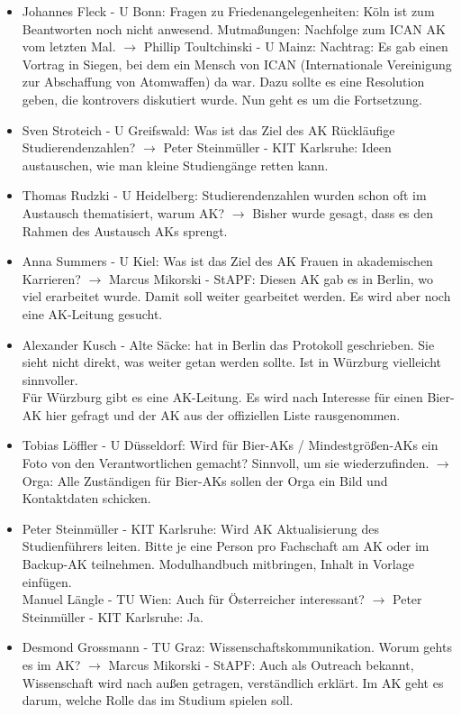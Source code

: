     \begin{itemize}
      \item Johannes Fleck - U Bonn:  Fragen zu Friedenangelegenheiten: Köln ist zum Beantworten noch nicht anwesend. Mutmaßungen: Nachfolge zum ICAN AK vom letzten Mal.
        $\rightarrow$ Phillip Toultchinski - U Mainz:  Nachtrag: Es gab einen Vortrag in Siegen, bei dem ein Mensch von ICAN (Internationale Vereinigung zur Abschaffung von Atomwaffen) da war. Dazu sollte es eine Resolution geben, die kontrovers diskutiert wurde. Nun geht es um die Fortsetzung.
      \item Sven Stroteich - U Greifswald:  Was ist das Ziel des AK Rückläufige Studierendenzahlen? $\rightarrow$ Peter Steinmüller - KIT Karlsruhe:  Ideen austauschen, wie man kleine Studiengänge retten kann.
      \item Thomas Rudzki - U Heidelberg:  Studierendenzahlen wurden schon oft im Austausch thematisiert, warum AK? $\rightarrow$ Bisher wurde gesagt, dass es den Rahmen des Austausch AKs sprengt.
      \item Anna Summers - U Kiel:  Was ist das Ziel des AK Frauen in akademischen Karrieren? $\rightarrow$ Marcus Mikorski - StAPF:  Diesen AK gab es in Berlin, wo viel erarbeitet wurde. Damit soll weiter gearbeitet werden. Es wird aber noch eine AK-Leitung gesucht.
      \item Alexander Kusch - Alte Säcke:  hat in Berlin das Protokoll geschrieben. Sie sieht nicht direkt, was weiter getan werden sollte. Ist in Würzburg vielleicht sinnvoller. \\
        Für Würzburg gibt es eine AK-Leitung. Es wird nach Interesse für einen Bier-AK hier gefragt und der AK aus der offiziellen Liste rausgenommen.
      \item Tobias Löffler - U Düsseldorf:  Wird für Bier-AKs / Mindestgrößen-AKs ein Foto von den Verantwortlichen gemacht? Sinnvoll, um sie wiederzufinden. $\rightarrow$ Orga: Alle Zuständigen für Bier-AKs sollen der Orga ein Bild und Kontaktdaten schicken.
      \item Peter Steinmüller - KIT Karlsruhe:  Wird AK Aktualisierung des Studienführers leiten. Bitte je eine Person pro Fachschaft am AK oder im Backup-AK teilnehmen. Modulhandbuch mitbringen, Inhalt in Vorlage einfügen. \\
        Manuel Längle - TU Wien:  Auch für Österreicher interessant? $\rightarrow$ Peter Steinmüller - KIT Karlsruhe:  Ja.
      \item Desmond Grossmann - TU Graz:  Wissenschaftskommunikation. Worum gehts es im AK? $\rightarrow$ Marcus Mikorski - StAPF:  Auch als Outreach bekannt, Wissenschaft wird nach außen getragen, verständlich erklärt. Im AK geht es darum, welche Rolle das im Studium spielen soll.

\end{itemize}

